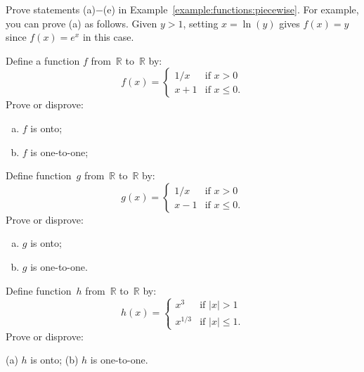 \begin{exercise}{}
Prove statements (a)$-$(e) in Example~\ref{example:functions:piecewise}.  For example, you can prove (a)  as follows. Given $y>1$, setting $x = \ln(y)$ gives $f(x) = y$ since $f(x) = e^x$ in this case. 
\end{exercise}

\begin{exercise}{} \label{OntoCasesExer}
 Define a function $f$  from~$\mathbb{R}$ to~$\mathbb{R}$ by:
$$ f(x) = 
\begin{cases}
1/x & \mbox{if $x > 0$} \\
x + 1 & \mbox{if $x \le 0$.}
\end{cases} $$
Prove or disprove:
\begin{multicols}{2}
 \begin{enumerate}[(a)]
 \item \label{OntoCasesExer-fOnto}
 $f$ is onto;
 \item \label{OntoCasesExer-fNot11}
 $f$ is one-to-one;
\end{enumerate}
\end{multicols}
\end{exercise}

\begin{exercise}{} \label{OntoCasesExer2}
 Define function~$g$ from~$\mathbb{R}$ to~$\mathbb{R}$ by:
$$ g(x) = 
\begin{cases}
1/x & \mbox{if $x > 0$} \\
x - 1 & \mbox{if $x \le 0$}
 . \end{cases} $$
Prove or disprove:
\begin{multicols}{2}
 \begin{enumerate}[(a)]
 \item \label{OntoCasesExer-gNotOnto}
 $g$ is onto;
 \item \label{OntoCasesExer-g11} 
 $g$ is one-to-one.
\end{enumerate}
\end{multicols}
\end{exercise}

\begin{exercise}{} \label{OntoCasesExer3}
 Define function~$h$ from~$\mathbb{R}$ to~$\mathbb{R}$ by:
$$ h(x) = 
\begin{cases}
x^{3} & \mbox{if $|x| > 1$} \\
x^{1/3} & \mbox{if $|x| \le 1$}
 . \end{cases} $$
Prove or disprove:

(a) \qquad  $h$ is onto; \qquad \qquad (b)  $h$ is one-to-one.
\end{exercise}


